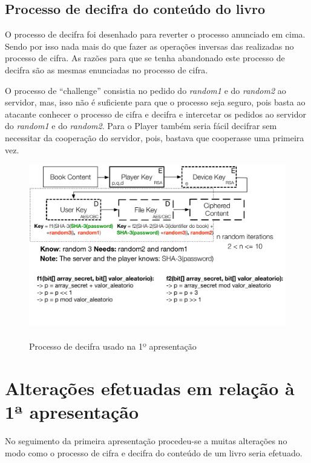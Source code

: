 \documentclass[pdftex,12pt,a4paper]{report}
\begin{document}
\subsection{Processo de decifra do conteúdo do livro}
O processo de decifra foi desenhado para reverter o processo anunciado em cima. Sendo por isso nada mais do que fazer as operações inversas das realizadas no processo de cifra. As razões para que se tenha abandonado este processo de decifra são as mesmas enunciadas no processo de cifra.

O processo de “challenge” consistia no pedido do \textit{random1} e do \textit{random2} ao servidor, mas, isso não é suficiente para que o processo seja seguro, pois basta ao atacante conhecer o processo de cifra e decifra e intercetar os pedidos ao servidor do \textit{random1} e do \textit{random2}. Para o Player também seria fácil decifrar sem necessitar da cooperação do servidor, pois, bastava que cooperasse uma primeira vez.

\begin{figure}[!htb]
\center
 \includegraphics[width=135mm,scale=1]{filekey-initial-decrypt.pdf}
 \caption{\\Processo de decifra usado na 1º apresentação}\label{fig:eer}
\end{figure}

\section{Alterações efetuadas em relação à 1ª apresentação}

No seguimento da primeira apresentação procedeu-se a muitas alterações no modo como o processo de cifra e decifra do conteúdo de um livro seria efetuado.	
\end{document}
